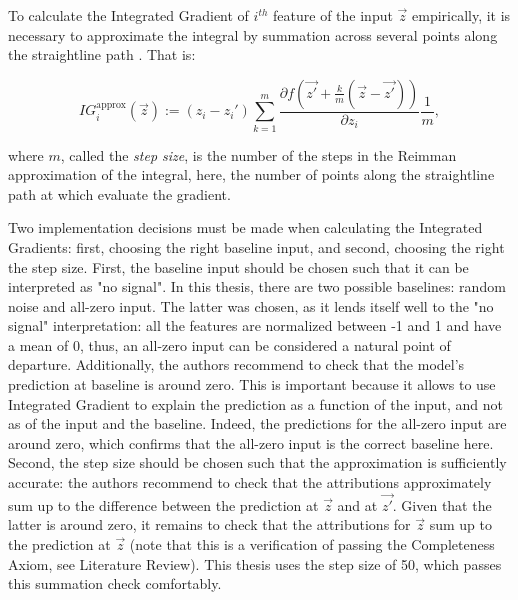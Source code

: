 			To calculate the Integrated Gradient of $i^{th}$ feature of the input $\vec{z}$ empirically, it is necessary to approximate the integral by summation across several points along the straightline path  \citep{sundararajan2017axiomatic}. That is:  
			
			\begin{equation*}
				IG_i^{\text{approx}}(\vec{z}) := (z_i - z_i') \sum_{k=1}^{m} \frac{\partial f(\vec{z'} + \frac{k}{m}(\vec{z}-\vec{z'}))}{\partial z_i}\frac{1}{m},
			\end{equation*} 
			
			where $m$, called the \textit{step size}, is the number of the steps in the Reimman approximation of the integral, here, the number of points along the straightline path at which evaluate the gradient. 
			
			Two implementation decisions must be made when calculating the Integrated Gradients: first, choosing the right baseline input, and second, choosing the right the step size. First, the baseline input should be chosen such that it can be interpreted as "no signal". In this thesis, there are two possible baselines: random noise and all-zero input. The latter was chosen, as it lends itself well to the "no signal" interpretation: all the features are normalized between -1 and 1 and have a mean of 0, thus, an all-zero input can be considered a natural point of departure. Additionally, the authors recommend to check that the model's prediction at baseline is around zero. This is important because it allows to use Integrated Gradient to explain the prediction as a function of the input, and not as of the input and the baseline. Indeed, the predictions for the all-zero input are around zero, which confirms that the all-zero input is the correct baseline here. Second, the step size should be chosen such that the approximation is sufficiently accurate: the authors recommend to check that the attributions approximately sum up to the difference between the prediction at $\vec{z}$ and at $\vec{z'}$. Given that the latter is around zero, it remains to check that the attributions for $\vec{z}$ sum up to the prediction at $\vec{z}$ (note that this is a verification of passing the Completeness Axiom, see Literature Review). This thesis uses the step size of 50, which passes this summation check comfortably.  
			
